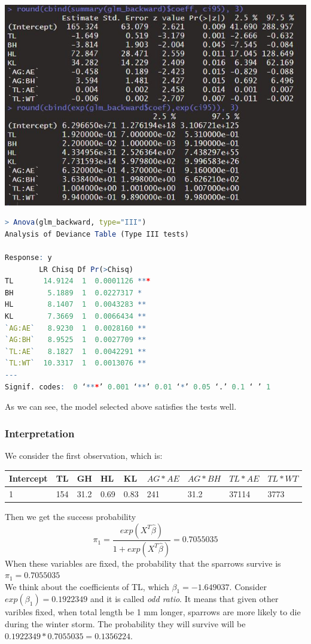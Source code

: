 \documentclass[12pt,a4paper]{article}
\begin{document}
\begin{center}
\includegraphics[scale = 0.6]{waldB.jpg}
\end{center}
\begin{lstlisting}[language = R]
> Anova(glm_backward, type="III")
Analysis of Deviance Table (Type III tests)

Response: y
        LR Chisq Df Pr(>Chisq)    
TL       14.9124  1  0.0001126 ***
BH        5.1889  1  0.0227317 *  
HL        8.1407  1  0.0043283 ** 
KL        7.3669  1  0.0066434 ** 
`AG:AE`   8.9230  1  0.0028160 ** 
`AG:BH`   8.9525  1  0.0027709 ** 
`TL:AE`   8.1827  1  0.0042291 ** 
`TL:WT`  10.3317  1  0.0013076 ** 
---
Signif. codes:  0 ‘***’ 0.001 ‘**’ 0.01 ‘*’ 0.05 ‘.’ 0.1 ‘ ’ 1
\end{lstlisting}
As we can see, the model selected above satisfies the tests well. 
\subsubsection{Interpretation}
We consider the first observation, which is:	
\begin{center}
\begin{tabular}{|l|l|l|l|l|l|l|l|l|}
\hline
Intercept & TL  & GH   & HL   & KL   & $AG*AE$ & $AG*BH$ & $TL*AE$ & $TL*WT$ \\ \hline
1         & 154 & 31.2 & 0.69 & 0.83 & 241     & 31.2    & 37114   & 3773    \\ \hline
\end{tabular}
\end{center}
Then we get the success probability \[\pi_1 = \frac{exp(X^T\hat{\beta})}{1+exp(X^T\hat{\beta})} = 0.7055035 \]
When these variables are fixed, the probability that the sparrows survive is $\pi_1 = 0.7055035 $\\
\newline
We think about the coefficients of TL, which $\beta_1 = -1.649037$. Consider $exp(\beta_1) = 0.1922349$ and it is called \emph{odd ratio}. It means that given other varibles fixed, when total length be 1 mm longer, sparrows are more likely to die during the winter storm. The probability they will survive will be $0.1922349 * 0.7055035 = 0.1356224$.
\end{document}
